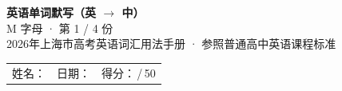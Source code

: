 \documentclass[10pt,a4paper]{article}
\begin{document}
\pagestyle{plain}

\begin{center}
{\LARGE\bfseries 英语单词默写（英 $\to$ 中）}\\[0.22em]
{\large M 字母 · 第 1 / 4 份}\\[0.18em]
{\small 2026年上海市高考英语词汇用法手册 · 参照普通高中英语课程标准}
\end{center}

\vspace{0.25em}
\noindent\begin{tabular}{@{}p{}@{}p{}@{}p{}@{}}
姓名：\underline{\hspace{2.0cm}} & 日期：\underline{\hspace{2.0cm}} & 得分：\underline{\hspace{1.3cm}}\,/\,50 \\
\end{tabular}

\vspace{0.3em}

\vspace{0.08em}
\end{document}
